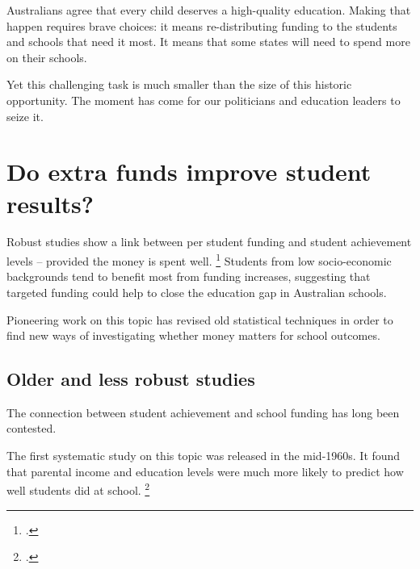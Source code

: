 \documentclass{grattan}
\begin{document}
Australians agree that every child deserves a high-quality education.
Making that happen requires brave choices: it means re-distributing funding to the students and schools that need it most.
It means that some states will need to spend more on their schools.

Yet this challenging task is much smaller than the size of this historic opportunity.
The moment has come for our politicians and education leaders to seize it.


\appendix


\chapter{Do extra funds improve student results?}\label{chap:appendix-2-do-extra-funds-improve-student-results}

Robust studies show a link between per student funding and student achievement levels -- provided the money is spent well.%
\footcites{Card2002Schoolfinancereform}{Chetty2011HowDoesYour}{Gibbons2012Doesadditionalspending}{Guryan2001DoesMoneyMatter}{Jackson2016EffectsSchoolSpending}{Lafortune2016SchoolFinanceReform}
 Students from low socio-economic backgrounds tend to benefit most from funding increases, suggesting that targeted funding could help to close the education gap in Australian schools.

Pioneering work on this topic has revised old statistical techniques in order to find new ways of investigating whether money matters for school outcomes.

\section{Older and less robust studies}\label{sec:criticism-of-older-studies}
The connection between student achievement and school funding has long been contested.

The first systematic study on this topic was released in the mid-1960s.
It found that parental income and education levels were much more likely to predict how well students did at school.%
\footcite{Coleman1966EqualityEducationalOpportunity}
\end{document}
